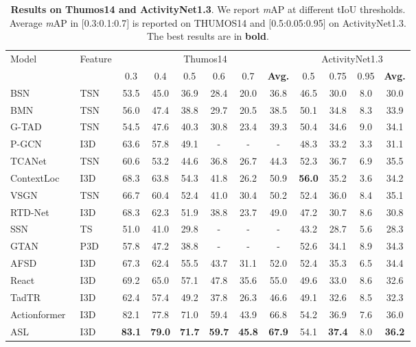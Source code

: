 \documentclass[10pt,twocolumn,letterpaper]{article}
\begin{document}
\begin{table*}[t]
 \centering 
 \caption{\label{tab:result_thumosandanet} \textbf{Results on Thumos14 and ActivityNet1.3}. We report \textit{m}AP at different tIoU thresholds. Average \textit{m}AP in $[$0.3:0.1:0.7$]$ is reported on THUMOS14 and $[$0.5:0.05:0.95$]$ on ActivityNet1.3. The best results are in \textbf{bold}. }
 \vspace{0.5em}
 \small
 {
  \begin{tabular}{l|l|cccccc|cccc} 
  \toprule
  \multirow{2}{*}{Model} & \multirow{2}{*}{Feature} & \multicolumn{6}{c}{Thumos14} & \multicolumn{4}{c}{ActivityNet1.3}\tabularnewline
 & & 0.3  & 0.4 & 0.5 & 0.6& 0.7 & \textbf{Avg.} & 0.5 & 0.75 & 0.95 & \textbf{Avg.} \\

    \hline
     BSN~\cite{BSN2018arXiv} & TSN~\cite{tsn} & 53.5 & 45.0 & 36.9 & 28.4 & 20.0 & 36.8 & 46.5 & 30.0 & 8.0 & 30.0 \tabularnewline 
    BMN~\cite{lin2019bmn} & TSN~\cite{tsn}& 56.0 & 47.4 & 38.8 & 29.7 & 20.5 & 38.5 & 50.1 & 34.8 & 8.3 & 33.9  \tabularnewline 
    G-TAD~\cite{xu2020gtad} & TSN~\cite{tsn} & 54.5 & 47.6 & 40.3 & 30.8 & 23.4 & 39.3 & 50.4 & 34.6 & 9.0 & 34.1\tabularnewline 
    P-GCN~\cite{PGCN2019ICCV} & I3D~\cite{i3d} & 63.6 &57.8 &49.1 & - & - & - & 48.3 & 33.2 & 3.3 & 31.1 \tabularnewline 
    TCANet~\cite{tcanet} & TSN~\cite{tsn} & 60.6 & 53.2 & 44.6 & 36.8 & 26.7 & 44.3 & 52.3 & 36.7 & 6.9 & 35.5 \tabularnewline 
    ContextLoc~\cite{contextloc} & I3D~\cite{i3d} & 68.3 & 63.8 & 54.3 & 41.8 & 26.2 & 50.9 & \textbf{56.0} & 35.2 & 3.6 & 34.2
   \tabularnewline 
    VSGN~\cite{vsgn} & TSN~\cite{tsn} & 66.7 & 60.4 & 52.4 & 41.0 & 30.4 & 50.2 & 52.4 & 36.0 & 8.4 & 35.1
     \tabularnewline 
     RTD-Net~\cite{rtdnet} & I3D~\cite{i3d} & 68.3 & 62.3 & 51.9 & 38.8 & 23.7 & 49.0 & 47.2  & 30.7 & 8.6 & 30.8
    \tabularnewline 
      SSN~\cite{SSN2017ICCV} & TS~\cite{ts} & 51.0 & 41.0 & 29.8 & - & - & - & 43.2 & 28.7 & 5.6 & 28.3 \tabularnewline 
      GTAN~\cite{gtan} & P3D~\cite{p3d} & 57.8 & 47.2 & 38.8 & - & - & -  & {52.6} & 34.1 & 8.9 & 34.3 \tabularnewline 
     AFSD~\cite{afsd} & I3D~\cite{i3d} & 67.3 & 62.4 & 55.5 & 43.7 & 31.1 & 52.0 & 52.4 & 35.3 & 6.5 & 34.4 \tabularnewline 
     React~\cite{shi2022react} & I3D~\cite{i3d} & 69.2 & 65.0 & 57.1 & 47.8 & 35.6 & 55.0 &49.6 & 33.0 & 8.6 & 32.6 \tabularnewline
     TadTR~\cite{tadtr} & I3D~\cite{i3d} & 62.4 & 57.4 & 49.2 & 37.8 & 26.3 & 46.6 & 49.1 & 32.6 & 8.5 & 32.3 \tabularnewline 
   Actionformer~\cite{zhang2022actionformer} & I3D~\cite{i3d} & 82.1 & 77.8 & 71.0 & 59.4 & 43.9 & 66.8 & 54.2 & 36.9 & 7.6 & 36.0 \tabularnewline
   \hline
    ASL & I3D~\cite{i3d} & \textbf{83.1} & \textbf{79.0} & \textbf{71.7} & \textbf{59.7} & \textbf{45.8} & \textbf{67.9} & 54.1 & \textbf{37.4} & 8.0 & \textbf{36.2} \tabularnewline
\bottomrule
\end{tabular}
 }
\end{table*}
\end{document}
